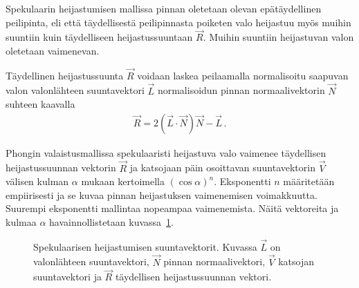 \documentclass[finnish]{tktltiki2}
\theoremstyle{definition}
\theoremstyle{remark}
\begin{document}
Spekulaarin heijastumisen mallissa pinnan oletetaan olevan epätäydellinen peilipinta, eli että täydellisestä peilipinnasta poiketen valo heijastuu myös muihin suuntiin kuin täydelliseen heijastussuuntaan $\vec{R}$. Muihin suuntiin heijastuvan valon oletetaan vaimenevan.

Täydellinen heijastussuunta $\vec{R}$ voidaan laskea peilaamalla normalisoitu saapuvan valon valonlähteen suuntavektori $\vec{L}$ normalisoidun pinnan normaalivektorin $\vec{N}$ suhteen kaavalla
\begin{align*}
\vec{R} = 2(\vec{L}\cdot\vec{N})\vec{N} - \vec{L}\,.
\end{align*}

Phongin valaistusmallissa spekulaaristi heijastuva valo vaimenee täydellisen heijastussuunnan vektorin $\vec{R}$ ja katsojaan päin osoittavan suuntavektorin $\vec{V}$ välisen kulman $\alpha$ mukaan kertoimella $(\cos\alpha)^n$. Eksponentti $n$ määritetään empiirisesti ja se kuvaa pinnan heijastuksen vaimenemisen voimakkuutta. Suurempi eksponentti mallintaa nopeampaa vaimenemista. Näitä vektoreita ja kulmaa $\alpha$ havainnollistetaan kuvassa~\ref{fig:Phong_suuntavektorit}.

\begin{figure}[h]
\centering
{}
\caption{Spekulaarisen heijastumisen suuntavektorit. Kuvassa $\vec{L}$ on valonlähteen suuntavektori, $\vec{N}$ pinnan normaalivektori, $\vec{V}$ katsojan suuntavektori ja $\vec{R}$ täydellisen heijastussuunnan vektori.}
\label{fig:Phong_suuntavektorit}
\end{figure}
\end{document}
